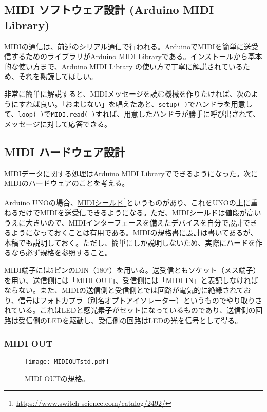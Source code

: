 \documentclass[uplatex, 10pt, dvipdfmx]{jsarticle}
\numberwithin{equation}{section}
\begin{document}
\subsection{MIDI ソフトウェア設計 (Arduino MIDI Library)}
MIDIの通信は、前述のシリアル通信で行われる。ArduinoでMIDIを簡単に送受信するためのライブラリがArduino MIDI Libraryである。インストールから基本的な使い方まで、Arduino MIDI Library の使い方\cite{ArduinoMIDILib}で丁寧に解説されているため、それを熟読してほしい。

非常に簡単に解説すると、MIDIメッセージを読む機械を作りたければ、次のようにすれば良い。「おまじない」を唱えたあと、\verb|setup( )|でハンドラを用意して、\verb|loop( )|で\verb|MIDI.read( )|すれば、用意したハンドラが勝手に呼び出されて、メッセージに対して応答できる。

\subsection{MIDI ハードウェア設計}
MIDIデータに関する処理はArduino MIDI Libraryでできるようになった。次にMIDIのハードウェアのことを考える。

Arduino UNOの場合、\href{https://www.switch-science.com/catalog/2492/}{MIDIシールド}\footnote{\url{https://www.switch-science.com/catalog/2492/}}というものがあり、これをUNOの上に重ねるだけでMIDIを送受信できるようになる。ただ、MIDIシールドは値段が高いうえに大きいので、MIDIインターフェースを備えたデバイスを自分で設計できるようになっておくことは有用である。MIDIの規格書\cite{規格}\cite{3.3V}に設計は書いてあるが、本稿でも説明しておく。ただし、簡単にしか説明しないため、実際にハードを作るなら必ず規格を参照すること。

MIDI端子には5ピンのDIN（180$^\circ$）を用いる。送受信ともソケット（メス端子）を用い、送信側には「MIDI OUT」、受信側には「MIDI IN」と表記しなければならない。また、MIDIの送信側と受信側とでは回路が電気的に絶縁されており、信号はフォトカプラ（別名オプトアイソレーター）というものでやり取りされている。これはLEDと感光素子がセットになっているものであり、送信側の回路は受信側のLEDを駆動し、受信側の回路はLEDの光を信号として得る。

\subsubsection{MIDI OUT}
\begin{figure}[h]
  \centering
  \texttt{[image: MIDIOUTstd.pdf]}
  \caption{MIDI OUTの規格\cite{規格}。}
  \label{figMIDIOUTstd}
\end{figure}
\end{document}
